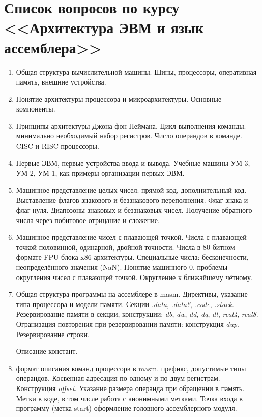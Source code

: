 \documentclass[a4paper,10pt]{article}
\begin{document}
\section*{Список вопросов по курсу <<Архитектура ЭВМ и язык ассемблера>>}
\begin{enumerate}
    \item
        Общая структура вычислительной машины. Шины, процессоры, оперативная память, внешние устройства.
    \item
        Понятие архитектуры процессора и микроархитектуры. Основные компоненты.
    \item 
        Принципы архитектуры Джона фон Неймана. Цикл выполнения команды. минимально необходимый набор регистров.
        Число операндов в команде. CISC и RISC процессоры.
    \item
        Первые ЭВМ, первые устройства ввода и вывода. Учебные машины УМ-3, УМ-2, УМ-1, как примеры организации первых ЭВМ.
    \item
        Машинное представление целых чисел: прямой код, дополнительный код. Выставление флагов знакового и беззнакового переполнения.
        Флаг знака и флаг нуля. Диапозоны знаковых и беззнаковых чисел. Получение обратного числа через побитовое отрицание и сложение.
    \item
        Машинное представление чисел с плавающей точкой. Числа с плавающей точкой половинной, одинарной, двойной точности. Числа в 80 битном формате
        FPU блока x86 архитектуры. Специальные числа: бесконечности, неопределённого значения (NaN). Понятие машинного 0, проблемы округления
        чисел с плавающей точкой. Округление к ближайшему чётному.
    \item
        Общая структура программы на ассемблере в masm. Директивы, указание типа процессора и модели памяти.
            Секции \textit{.data}, \textit{.data?}, \textit{.code}, \textit{.stack}.
        Резервирование памяти в секции, конструкции:
            \textit{db}, \textit{dw}, \textit{dd}, \textit{dq}, \textit{dt}, \textit{real4},
            \textit{real8}. Огранизация повторения при резервировании памяти: конструкция \textit{dup}. 
            Резервирование строки.
    
            Описание констант.
    
    \item
       формат описания команд процессорв в masm. префикс, допустимые типы операндов. Косвенная адресация по одному и по двум регистрам.
       Конструкция \textit{offset}. Указание размера операнда при обращении в память. Метки в коде, в том числе работа с анонимными метками.
       Точка входа в программу (метка start) оформление головного ассемблерного модуля.
    

\end{enumerate}
\end{document}
